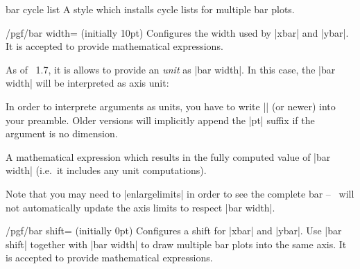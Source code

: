 {\begin{pgfplotskey}{bar cycle list}
	A style which installs cycle lists for multiple bar plots.
\begin{codeexample}
\end{codeexample}
	
\end{pgfplotskey}

\begin{key}{/pgf/bar width= (initially 10pt)}
	Configures the width used by |xbar| and |ybar|. It is accepted to provide mathematical expressions.

	As of \PGFPlots\ 1.7, it is allows to provide an \emph{unit} as |bar width|. In this case, the |bar width| will be interpreted as axis unit:
\begin{codeexample}[]
\end{codeexample}
	In order to interprete arguments as units, you have to write |\pgfplotsset{compat=1.7}| (or newer) into your preamble. Older versions will implicitly append the |pt| suffix if the argument is no dimension.

	\begin{command}{\pgfplotbarwidth}
		A mathematical expression which results in the fully computed value of |bar width| (i.e.\ it includes any unit computations). 
	\end{command}

	Note that you may need to |enlargelimits| in order to see the complete bar -- \PGFPlots\ will not automatically update the axis limits to respect |bar width|.
\end{key}

\begin{key}{/pgf/bar shift= (initially 0pt)}
	Configures a shift for |xbar| and |ybar|. Use |bar shift| together with |bar width| to draw multiple bar plots into the same axis. It is accepted to provide mathematical expressions.


\end{key}}
